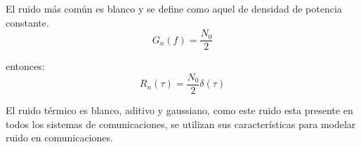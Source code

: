 \documentclass{article}
\begin{document}
El ruido más común es blanco y se define como aquel de densidad de potencia constante.\citep{Capitulo1SC}\\

\begin{equation}
    G_n(f)=\frac{N_0}{2}
\end{equation}

entonces:\\


\begin{equation}
    R_n(\tau)=\frac{N_0}{2} \delta (\tau)
\end{equation}

El ruido térmico es blanco, aditivo y gaussiano, como este ruido esta presente en todos los sistemas de comunicaciones, se utilizan sus características para modelar ruido en comunicaciones.\citep{Capitulo1SC}










\end{document}
